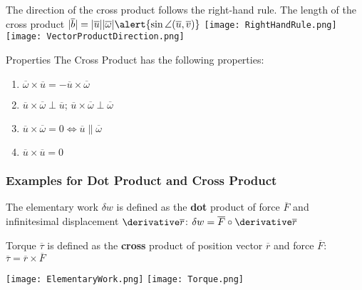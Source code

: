 \begin{frame}
The direction of the cross product follows the \alert{right-hand rule}. The length of the cross product $|\overline{b}|=|\overline{u}||\overline{\omega}|\alert{\sin\angle (\overline {u},\overline{v})}$
\texttt{[image: RightHandRule.png]}
\texttt{[image: VectorProductDirection.png]}
\begin{block}{Properties}
The Cross Product has the following properties:
\begin{enumerate}
\item{$\overline{\omega}\times\overline{u}=-\overline{u}\times\overline{\omega}$}
\item{$\overline{u}\times \overline{\omega}\perp \overline{u}$; $\overline{u}\times \overline{\omega}\perp \overline{\omega}$}
\item{$\overline{u}\times \overline{\omega}=0 \Leftrightarrow \overline{u}\parallel \overline{\omega}$}
\item{$\overline{u}\times\overline{u}=0$}
\end{enumerate}
\end{block}
\end{frame}
\begin{frame}
\frametitle{Examples for Dot Product and Cross Product}
\begin{example}
The elementary work $\delta w$ is defined as the \textbf{dot} product of force $\overline{F}$ and \alert{infinitesimal displacement} $\derivative\overline{r}$: $\delta w=\overline{F}\circ \derivative \overline{r}$
\end{example}
\begin{example}
Torque $\overline{\tau}$ is defined as the \textbf{cross} product of \alert{position vector} $\overline{r}$ and force $\overline{F}$: $\overline{\tau}=\overline{r}\times\overline{F}$
\end{example}
\texttt{[image: ElementaryWork.png]}
\texttt{[image: Torque.png]}
\end{frame}
